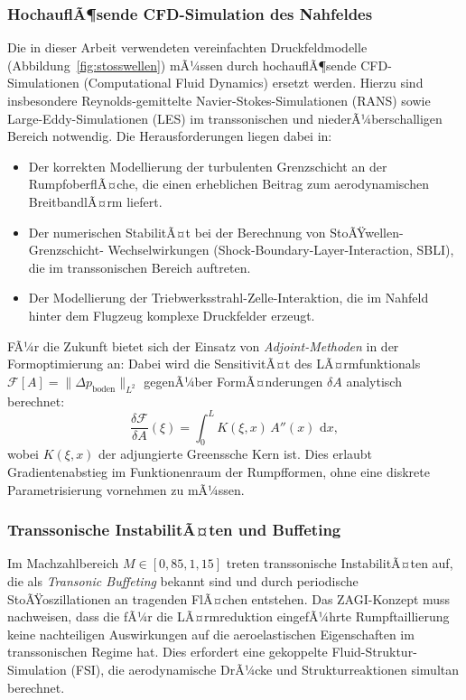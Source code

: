 ﻿\documentclass[12pt,a4paper]{article}
\theoremstyle{definition}
\theoremstyle{remark}
\newcommand{\dd}{\,\mathrm{d}}
\begin{document}
\subsubsection{HochauflÃ¶sende CFD-Simulation des Nahfeldes}

Die in dieser Arbeit verwendeten vereinfachten Druckfeldmodelle (Abbildung~\ref{fig:stosswellen})
mÃ¼ssen durch hochauflÃ¶sende CFD-Simulationen (Computational Fluid Dynamics) ersetzt werden.
Hierzu sind insbesondere Reynolds-gemittelte Navier-Stokes-Simulationen (RANS) sowie
Large-Eddy-Simulationen (LES) im transsonischen und niederÃ¼berschalligen Bereich notwendig.
Die Herausforderungen liegen dabei in:

\begin{itemize}
  \item Der korrekten Modellierung der turbulenten Grenzschicht an der RumpfoberflÃ¤che,
        die einen erheblichen Beitrag zum aerodynamischen BreitbandlÃ¤rm liefert.
  \item Der numerischen StabilitÃ¤t bei der Berechnung von StoÃŸwellen-Grenzschicht-
        Wechselwirkungen (Shock-Boundary-Layer-Interaction, SBLI), die im transsonischen
        Bereich auftreten.
  \item Der Modellierung der Triebwerksstrahl-Zelle-Interaktion, die im Nahfeld hinter
        dem Flugzeug komplexe Druckfelder erzeugt.
\end{itemize}

FÃ¼r die Zukunft bietet sich der Einsatz von \emph{Adjoint-Methoden} in der
Formoptimierung an: Dabei wird die SensitivitÃ¤t des LÃ¤rmfunktionals
$\mathcal{F}[A] = \|\Delta p_\text{boden}\|_{L^2}$ gegenÃ¼ber FormÃ¤nderungen $\delta A$
analytisch berechnet:
\begin{equation}
  \frac{\delta \mathcal{F}}{\delta A}(\xi) = \int_0^L K(\xi, x)\, A''(x)\, \dd x,
  \label{eq:adjoint}
\end{equation}
wobei $K(\xi, x)$ der adjungierte Greenssche Kern ist. Dies erlaubt Gradientenabstieg
im Funktionenraum der Rumpfformen, ohne eine diskrete Parametrisierung vornehmen zu mÃ¼ssen.

\subsubsection{Transsonische InstabilitÃ¤ten und Buffeting}

Im Machzahlbereich $M \in [0{,}85, 1{,}15]$ treten transsonische InstabilitÃ¤ten auf,
die als \emph{Transonic Buffeting} bekannt sind und durch periodische StoÃŸoszillationen
an tragenden FlÃ¤chen entstehen. Das ZAGI-Konzept muss nachweisen, dass die fÃ¼r die
LÃ¤rmreduktion eingefÃ¼hrte Rumpftaillierung keine nachteiligen Auswirkungen auf die
aeroelastischen Eigenschaften im transsonischen Regime hat. Dies erfordert eine
gekoppelte Fluid-Struktur-Simulation (FSI), die aerodynamische DrÃ¼cke und Strukturreaktionen
simultan berechnet.
\end{document}
